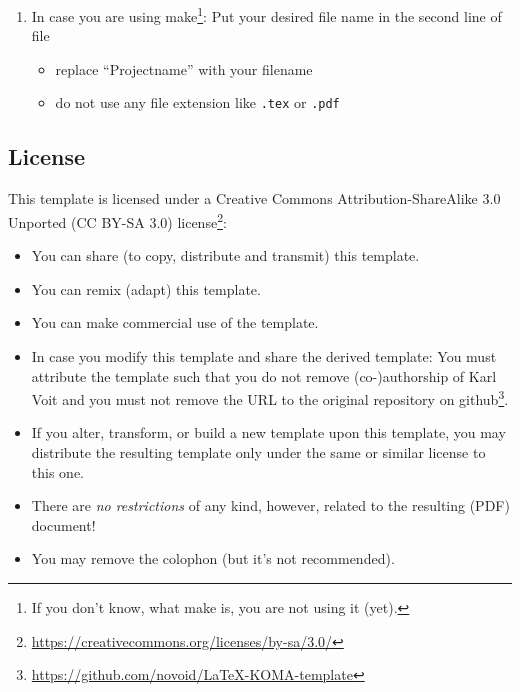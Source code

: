 \begin{enumerate}
  \begin{itemize}
  \item Please spend a couple of minutes and think about putting your work
        under an open license\footnote{\url{https://creativecommons.org/licenses/}}
        in order to follow the spirit of Open Science\footnote{\url{https://en.wikipedia.org/wiki/Open_science}}.
  \end{itemize}
\item In case you are using  make\footnote{If you
      don't know, what  make is, you are not using it (yet).}: 
      Put your desired  file name in the second line of file
   \begin{itemize}
   \item replace \enquote{Projectname} with your filename
   \item do not use any file extension like \texttt{.tex} or \texttt{.pdf}
   \end{itemize}
\end{enumerate}




\subsection{License}
\label{sec:license}

This template is licensed under a Creative Commons Attribution-ShareAlike 3.0 Unported (CC BY-SA 3.0)
        license\footnote{\url{https://creativecommons.org/licenses/by-sa/3.0/}}:
    \begin{itemize}
    \item You can share (to copy, distribute and transmit) this template.
    \item You can remix (adapt) this template.
    \item You can make commercial use of the template.
    \item In case you modify this template and share the derived
          template: You must attribute the template such that you do not
          remove \mbox{(co-)}authorship of Karl Voit and you must not remove
          the URL to the original repository on 
          github\footnote{\url{https://github.com/novoid/LaTeX-KOMA-template}}.
    \item If you alter, transform, or build a new template upon 
          this template, you may distribute the resulting 
          template only under the same or similar license to this one. 
    \item There are \emph{no restrictions} of any kind, however, related to the
          resulting (PDF) document!
    \item You may remove the colophon (but it's not recommended).
    \end{itemize}





